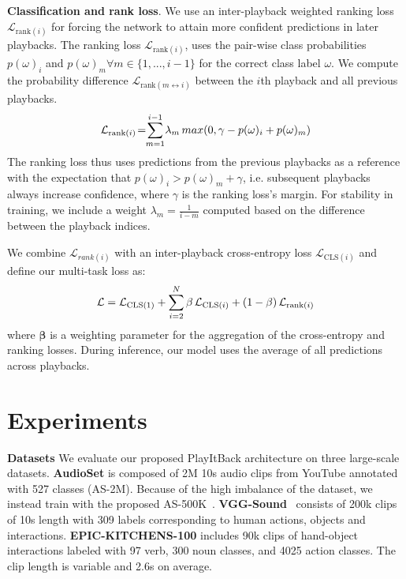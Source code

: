 \documentclass{article}
\begin{document}
\noindent
\textbf{Classification and rank loss}. We use an inter-playback weighted ranking loss $\mathcal{L}_{\text{rank}(i)}$ for forcing the network to attain more confident predictions in later playbacks. The ranking loss $ \mathcal{L}_{\text{rank}(i)}$, uses the pair-wise class probabilities $p(\omega)_i$ and $p(\omega)_{m} \forall m \! \in \! \{1,...,i\!-\!1\}$ for the correct class label $\omega$. We compute the probability difference $\mathcal{L}_{\text{rank}(m \leftrightarrow i)}$ between the $i$th playback and all previous playbacks.
\begin{equation}
    \mathcal{L}_{\text{rank}(i)} \! = \! \smashoperator{\sum_{m = 1}^{i-1}} \lambda_m \, 
    max(0, \gamma - p(\omega)_{i} + p(\omega)_{m})
\end{equation}
The ranking loss thus uses predictions from the previous playbacks as a reference with the expectation that $p(\omega)_i \! > \! p(\omega)_m + \gamma$, i.e. subsequent playbacks always increase confidence, where $\gamma$ is the ranking loss's margin. For stability in training, we include a weight $\lambda_m = \frac{1}{i-m}$ computed based on the difference between the playback indices. 

We combine $\mathcal{L}_{rank(i)}$ with an inter-playback cross-entropy loss $\mathcal{L}_{\text{CLS}(i)}$ and define our multi-task loss as: 
\begin{equation}
\label{eq:loss}
   \mathcal{L} = \mathcal{L}_{\text{CLS}(1)} + \smashoperator{\sum_{i=2}^N} \mathbf{\beta} \, \mathcal{L}_{\text{CLS}(i)} + (1-\mathbf{\beta}) \, \mathcal{L}_{\text{rank}(i)}
\end{equation}
where $\mathbf{\beta}$ is a weighting parameter for the aggregation of the cross-entropy and ranking losses. During inference, our model uses the average of all predictions across playbacks.  






\section{Experiments}
\label{sec:experiments}

\noindent
\textbf{Datasets} We evaluate our proposed PlayItBack architecture on three large-scale datasets. \textbf{AudioSet} \cite{gemmeke2017audio} is composed of 2M 10s audio clips from YouTube annotated with 527 classes (AS-2M). Because of the high imbalance of the dataset, we instead train with the proposed AS-500K~\cite{nagrani2021attention}.  \textbf{VGG-Sound}~\cite{chen2020vggsound} consists of 200k clips of 10s length with 309 labels corresponding to human actions, objects and interactions. \textbf{EPIC-KITCHENS-100} \cite{damen2022rescaling} includes 90k clips of hand-object interactions labeled with 97 verb, 300 noun classes, and 4025 action classes. The clip length is variable and 2.6s on average.
\end{document}
